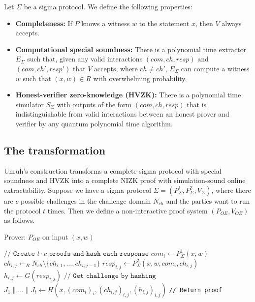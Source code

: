 \documentclass[runningheads,a4paper]{llncs}
\begin{document}
Let $\Sigma$ be a sigma protocol. We define the following properties:
\begin{itemize}
	\item
	{\bf Completeness:} If $P$ knows a witness $w$ to the statement $x$, then $V$ always accepts.

	\item
	{\bf Computational special soundness:} There is a polynomial time extractor $E_\Sigma$ such that, given any valid interactions $(com,ch,resp)$ and $(com, ch', resp')$ that $V$ accepts, where $ch \neq ch'$, $E_\Sigma$ can compute a witness $w$ such that $(x,w) \in R$ with overwhelming probability.

	\item
	{\bf Honest-verifier zero-knowledge (HVZK):} There is a polynomial time simulator $S_\Sigma$ with outputs of the form $(com, ch, resp)$ that is indistinguishable from valid interactions between an honest prover and verifier by any quantum polynomial time algorithm.

\end{itemize}

\subsection{The transformation}
Unruh's construction transforms a complete sigma protocol with special soundness and HVZK into a complete NIZK proof with simulation-sound online extractability. Suppose we have a sigma protocol $\Sigma = (P_\Sigma^1, P_\Sigma^2, V_\Sigma)$, where there are $c$ possible challenges in the challenge domain $N_{ch}$ and the parties want to run the protocol $t$ times.  Then we define a non-interactive proof system $(P_{OE}, V_{OE})$ as follows.

\begin{algorithm}
\caption{Prover: $P_{OE}$ on input $(x,w)$}
\begin{algorithmic}
\STATE $\texttt{// Create $t\cdot c$ proofs and hash each response}$
	\STATE $com_i \leftarrow P_\Sigma^1(x,w)$
		\STATE $ch_{i,j} \leftarrow_R N_{ch} \setminus \{ch_{i,1},\dots,ch_{i,j-1}\}$
		\STATE $resp_{i,j} \leftarrow P_\Sigma^2(x,w,com_i, ch_{i,j})$
		\STATE $h_{i,j} \leftarrow G(resp_{i,j})$
	\ENDFOR
\ENDFOR
\vspace{2mm}
\STATE $\texttt{// Get challenge by hashing}$
\STATE $J_1 \| \dots \| J_t \leftarrow H(x, (com_i)_i, (ch_{i,j})_{i,j}, (h_{i,j})_{i,j})$ 
\vspace{2mm}
\STATE \texttt{// Return proof}
\end{algorithmic}
\end{algorithm}
\end{document}
